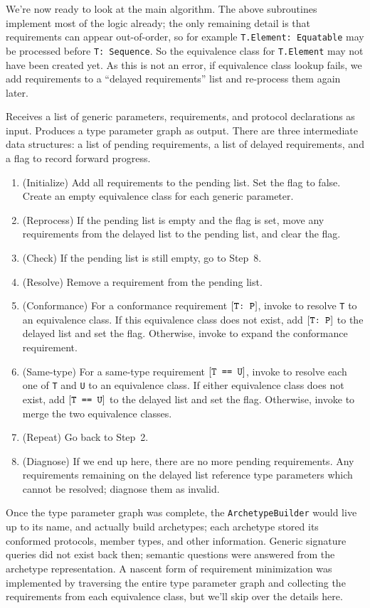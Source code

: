 \documentclass[../generics]{subfiles}
\begin{document}
We're now ready to look at the main algorithm. The above subroutines implement most of the logic already; the only remaining detail is that requirements can appear out-of-order, so for example \texttt{T.Element:~Equatable} may be processed before \texttt{T:~Sequence}. So the equivalence class for \texttt{T.Element} may not have been created yet. As this is not an error, if equivalence class lookup fails, we add requirements to a ``delayed requirements'' list and re-process them again later.
\begin{algorithm}\label{archetypebuilder} Receives a list of generic parameters, requirements, and protocol declarations as input. Produces a type parameter graph as output.
There are three intermediate data structures: a list of pending requirements, a list of delayed requirements, and a flag to record forward progress.
\begin{enumerate}
\item (Initialize) Add all requirements to the pending list. Set the flag to false. Create an empty equivalence class for each generic parameter.
\item (Reprocess) If the pending list is empty and the flag is set, move any requirements from the delayed list to the pending list, and clear the flag.
\item (Check) If the pending list is still empty, go to Step~8.
\item (Resolve) Remove a requirement from the pending list.
\item (Conformance) For a conformance requirement $[\texttt{T:~P}]$, invoke  to resolve \texttt{T} to an equivalence class. If this equivalence class does not exist, add $[\texttt{T:~P}]$ to the delayed list and set the flag. Otherwise, invoke  to expand the conformance requirement.
\item (Same-type) For a same-type requirement $[\texttt{T == U}]$, invoke  to resolve each one of \texttt{T} and \texttt{U} to an equivalence class. If either equivalence class does not exist, add $[\texttt{T == U}]$ to the delayed list and set the flag. Otherwise, invoke  to merge the two equivalence classes.
\item (Repeat) Go back to Step~2.
\item (Diagnose) If we end up here, there are no more pending requirements. Any requirements remaining on the delayed list reference type parameters which cannot be resolved; diagnose them as invalid.
\end{enumerate}
\end{algorithm}
Once the type parameter graph was complete, the \texttt{ArchetypeBuilder} would live up to its name, and actually build archetypes; each archetype stored its conformed protocols, member types, and other information. Generic signature queries did not exist back then; semantic questions were answered from the archetype representation. A nascent form of requirement minimization was implemented by traversing the entire type parameter graph and collecting the requirements from each equivalence class, but we'll skip over the details here.
\end{document}

